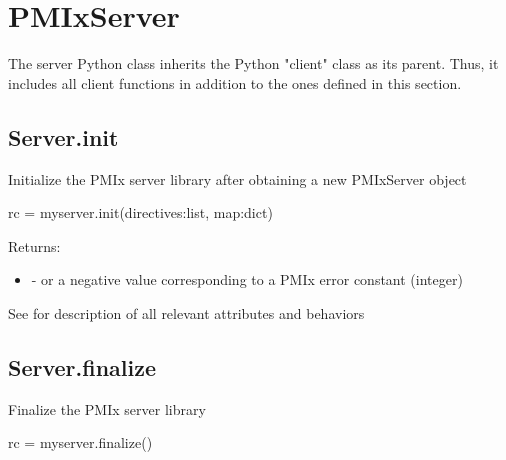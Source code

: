 \section{PMIxServer}
\label{app:python:server}

The server Python class inherits the Python "client" class as its parent. Thus, it includes all client functions in addition to the ones defined in this section.

\subsection{Server.init}

\summary Initialize the \ac{PMIx} server library after obtaining a new PMIxServer object

\format

\pyspecificstart
\begin{codepar}
rc = myserver.init(directives:list, map:dict)
\end{codepar}
\pyspecificend


\begin{arglist}
\end{arglist}

Returns:

\begin{itemize}
    \item {} -  or a negative value corresponding to a PMIx error constant (integer)
\end{itemize}


See  for description of all relevant attributes and behaviors


\subsection{Server.finalize}

\summary Finalize the \ac{PMIx} server library

\format

\pyspecificstart
\begin{codepar}
rc = myserver.finalize()
\end{codepar}
\pyspecificend


